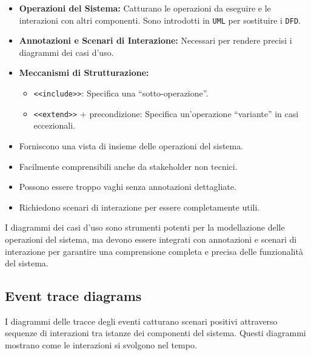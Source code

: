 \begin{itemize}
    \item \textbf{Operazioni del Sistema:} Catturano le operazioni da eseguire
    e le interazioni con altri componenti. Sono introdotti in \texttt{UML} per sostituire i \texttt{DFD}.
    \item \textbf{Annotazioni e Scenari di Interazione:} Necessari per rendere
    precisi i diagrammi dei casi d'uso.
    \item \textbf{Meccanismi di Strutturazione:}
    \begin{itemize}
        \item \texttt{<<include>>}: Specifica una ``sotto-operazione''.
        \item \texttt{<<extend>>} + precondizione: Specifica un'operazione
        ``variante'' in casi eccezionali.
    \end{itemize}
\end{itemize}

\begin{tcolorbox}[colback=green!5!white,colframe=green!75!black,title=Vantaggi
    dei Diagrammi dei Casi d'Uso]
    \begin{itemize}
        \item Forniscono una vista di insieme delle operazioni del sistema.
        \item Facilmente comprensibili anche da stakeholder non tecnici.
    \end{itemize}
\end{tcolorbox}

\begin{tcolorbox}[colback=red!5!white,colframe=red!75!black,title=Svantaggi
    dei Diagrammi dei Casi d'Uso]
    \begin{itemize}
        \item Possono essere troppo vaghi senza annotazioni dettagliate.
        \item Richiedono scenari di interazione per essere completamente utili.
    \end{itemize}
\end{tcolorbox}

I diagrammi dei casi d'uso sono strumenti potenti per la modellazione delle
operazioni del sistema, ma devono essere integrati con annotazioni e scenari
di interazione per garantire una comprensione completa e precisa delle funzionalità
del sistema.
\subsection{Event trace diagrams}
I diagrammi delle tracce degli eventi catturano scenari positivi attraverso
sequenze di interazioni tra istanze dei componenti del sistema. Questi diagrammi
mostrano come le interazioni si svolgono nel tempo.

